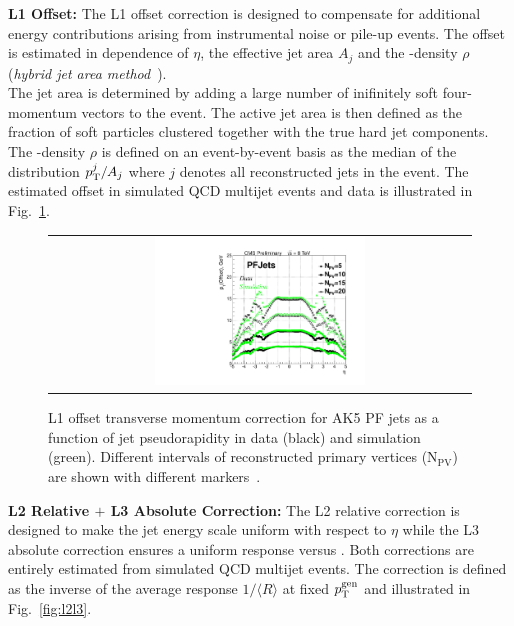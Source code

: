 \begin{description}
 \item \textbf{L1 Offset:} The L1 offset correction is designed to compensate for additional energy contributions arising from instrumental noise or pile-up events. The \pt offset is estimated in dependence of $\eta$, the effective jet area $A_j$ and the \pt-density $\rho$ (\textit{hybrid jet area method}~\cite{Cacciari2008119}). \\
The jet area is determined by adding a large number of inifinitely soft four-momentum vectors to the event. The active jet area is then defined as the fraction of soft particles clustered together with the true hard jet components. The \pt-density $\rho$ is defined on an event-by-event basis as the median of the distribution $p_{\text{T}}^{j}/A_{j}$ where $j$ denotes all reconstructed jets in the event. The estimated offset in simulated QCD multijet events and data is illustrated in Fig.~\ref{fig:l1offset}.
\begin{figure}[!h]
  \centering 
  \begin{tabular}{c}
    \includegraphics[width=0.51\textwidth]{figures/OffsetVsEta_NPV_PF5_data53_vs_mc53.pdf} 
  \end{tabular}
  \caption{L1 offset transverse momentum correction for AK5 PF jets as a function of jet pseudorapidity in data (black) and simulation (green). Different intervals of reconstructed primary vertices ($\mathrm{N_{PV}}$) are shown with different markers~\cite{CMS-DP-2013-033}.}
  \label{fig:l1offset}
\end{figure}
 \item \textbf{L2 Relative $+$ L3 Absolute Correction:} The L2 relative correction is designed to make the jet energy scale uniform with respect to $\eta$ while the L3 absolute correction ensures a uniform response versus \pt. Both corrections are entirely estimated from simulated QCD multijet events. The correction is defined as the inverse of the average response $1/\langle R \rangle$ at fixed $p_{\text{T}}^\mathrm{gen}$ and illustrated in Fig.~\ref{fig:l2l3}.

\end{description}
